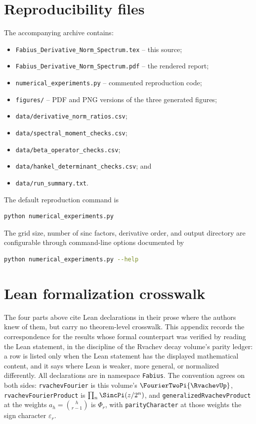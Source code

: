 \documentclass[11pt,oneside]{article}
\theoremstyle{definition}
\theoremstyle{remark}
\newcommand{\lean}[1]{%
  \ifmmode\text{\texttt{\detokenize{#1}}}\else\nolinkurl{#1}\fi}
\newcommand{\decl}[1]{\nolinkurl{#1}}
\begin{document}
\section{Reproducibility files}
\label{p4:app:reproducibility}

The accompanying archive contains:
\begin{itemize}
\item \texttt{Fabius\_Derivative\_Norm\_Spectrum.tex} -- this source;
\item \texttt{Fabius\_Derivative\_Norm\_Spectrum.pdf} -- the rendered report;
\item \texttt{numerical\_experiments.py} -- commented reproduction code;
\item \texttt{figures/} -- PDF and PNG versions of the three generated figures;
\item \texttt{data/derivative\_norm\_ratios.csv};
\item \texttt{data/spectral\_moment\_checks.csv};
\item \texttt{data/beta\_operator\_checks.csv};
\item \texttt{data/hankel\_determinant\_checks.csv}; and
\item \texttt{data/run\_summary.txt}.
\end{itemize}

The default reproduction command is
\begin{lstlisting}[style=code,language=bash]
python numerical_experiments.py
\end{lstlisting}
The grid size, number of sinc factors, derivative order, and output directory are configurable
through command-line options documented by
\begin{lstlisting}[style=code,language=bash]
python numerical_experiments.py --help
\end{lstlisting}

\section{Lean formalization crosswalk}\label{app:lean-crosswalk}

The four parts above cite Lean declarations in their prose where the authors
knew of them, but carry no theorem-level crosswalk.  This appendix records the
correspondence for the results whose formal counterpart was verified by
reading the Lean statement, in the discipline of the Rvachev decay volume's
parity ledger: a row is listed only when the Lean statement has the displayed
mathematical content, and it says where Lean is weaker, more general, or
normalized differently.  All declarations are in namespace \lean{Fabius}.
The convention agrees on both sides: \decl{rvachevFourier} is this volume's
$\FourierTwoPi{\RvachevUp}$, \decl{rvachevFourierProduct} is $\prod_n\SincPi(z/2^n)$, and
\decl{generalizedRvachevProduct} at the weights $a_h=\binom h{r-1}$ is
$\Phi_r$, with \decl{parityCharacter} at those weights the sign character
$\varepsilon_r$.
\end{document}
